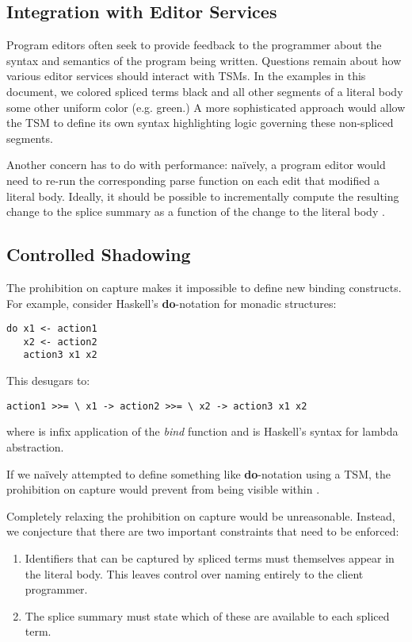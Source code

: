 \subsection{Integration with Editor Services}\label{sec:editor-integration}
Program editors often seek to provide feedback to the programmer about the syntax and semantics of the program being written. Questions remain about how various editor services should interact with TSMs. In the examples in this document, we colored spliced terms black and all other segments of a literal body some other uniform color (e.g. green.) A more sophisticated approach would allow the TSM to define its own syntax highlighting logic governing these non-spliced segments.

Another concern has to do with performance: na\"ively, a program editor would need to re-run the corresponding parse function on each edit that modified a literal body. Ideally, it should be possible to incrementally compute the resulting change to the splice summary as a function of the change to the literal body \cite{Ghezzi:1979:IP:357062.357066}.

\subsection{Controlled Shadowing}\label{sec:controlled-binding}

The prohibition on capture makes it impossible to define new binding constructs. For example, consider Haskell's \textbf{do}-notation for monadic structures:
\begin{lstlisting}[numbers=none]
do x1 <- action1
   x2 <- action2
   action3 x1 x2
\end{lstlisting}
This desugars to:
\begin{lstlisting}[numbers=none]
action1 >>= \ x1 -> action2 >>= \ x2 -> action3 x1 x2
\end{lstlisting}
where \li{>>=} is infix application of the  \emph{bind} function and  is Haskell's syntax for lambda abstraction.

If we na\"ively attempted to define something like \textbf{do}-notation using a TSM, the prohibition on capture would prevent  from being visible within .

Completely relaxing the prohibition on capture would be unreasonable. Instead, we conjecture that there are two important constraints that need to be enforced:
\begin{enumerate}
  \item Identifiers that can be captured by spliced terms must themselves appear in the literal body. This leaves control over naming entirely to the client programmer.
  \item The splice summary must state which of these are available to each spliced term.
\end{enumerate}

